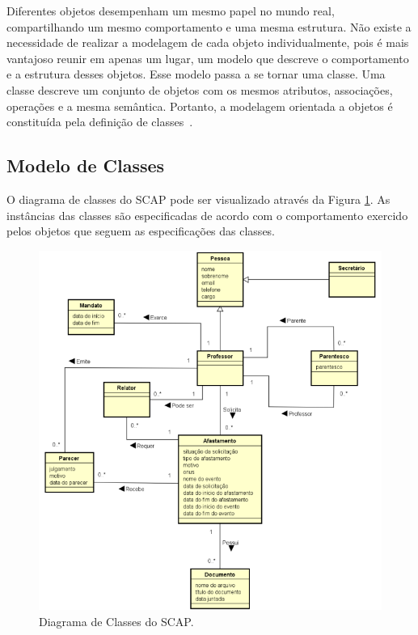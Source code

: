 Diferentes objetos desempenham um mesmo papel no mundo real, compartilhando um mesmo comportamento e uma mesma estrutura. Não existe a necessidade de realizar a modelagem de cada objeto individualmente, pois é mais vantajoso reunir em apenas um lugar, um modelo que descreve o comportamento e a estrutura desses objetos. Esse modelo passa a se tornar uma classe. Uma classe descreve um conjunto de objetos com os mesmos atributos, associações, operações e a mesma semântica. Portanto, a modelagem orientada a objetos é constituída pela definição de classes~\cite{falbo:er17}.    

\subsection{Modelo de Classes}
\label{sec-requisitos-modelo-classes}

O diagrama de classes do SCAP pode ser visualizado através da Figura \ref{fig-requisitos-diagrama-classes}. As instâncias das classes são especificadas de acordo com o comportamento exercido pelos objetos que seguem as especificações das classes. 

\begin{figure}[h]
	\centering
	\includegraphics[scale=0.7]{figuras/fig-requisitos-diagrama-classes} 
	\caption{Diagrama de Classes do SCAP.}
	\label{fig-requisitos-diagrama-classes}
\end{figure}

